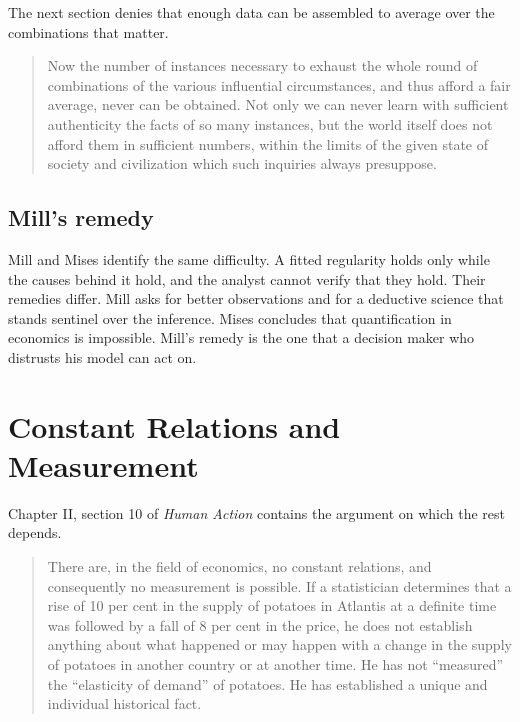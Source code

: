 \documentclass[12pt]{article}
\begin{document}
The next section denies that enough data can be assembled to average over the
combinations that matter.

\begin{quote}
Now the number of instances necessary to exhaust the whole round of combinations
of the various influential circumstances, and thus afford a fair average, never
can be obtained.  Not only we can never learn with sufficient authenticity the
facts of so many instances, but the world itself does not afford them in
sufficient numbers, within the limits of the given state of society and
civilization which such inquiries always presuppose.
\hfill \citep[Bk.~VI, ch.~IX, \S6]{Mill1882Logic}
\end{quote}

\subsection{Mill's remedy}

Mill and Mises identify the same difficulty.  A fitted regularity holds only
while the causes behind it hold, and the analyst cannot verify that they hold.
Their remedies differ.  Mill asks for better observations and for a deductive
science that stands sentinel over the inference.  Mises concludes that
quantification in economics is impossible.  Mill's remedy is the one that a
decision maker who distrusts his model can act on.

\section{Constant Relations and Measurement}
\label{sec:constants}

Chapter II, section 10 of \emph{Human Action} contains the argument on which
the rest depends.

\begin{quote}
There are, in the field of economics, no constant relations, and consequently
no measurement is possible.  If a statistician determines that a rise of 10 per
cent in the supply of potatoes in Atlantis at a definite time was followed by a
fall of 8 per cent in the price, he does not establish anything about what
happened or may happen with a change in the supply of potatoes in another
country or at another time.  He has not ``measured'' the ``elasticity of
demand'' of potatoes.  He has established a unique and individual historical
fact.
\hfill \citep[p.~55]{Mises1998HumanAction}
\end{quote}
\end{document}
